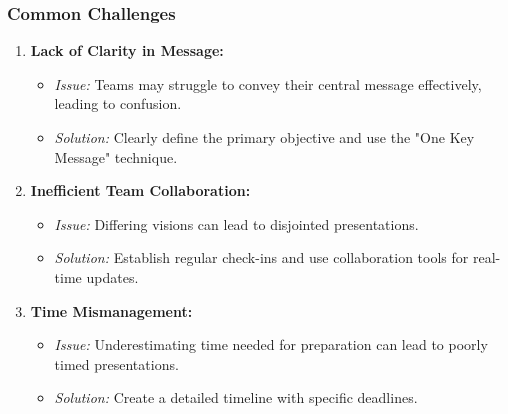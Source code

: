 \documentclass[aspectratio=169]{beamer}
\begin{document}
\begin{frame}[fragile]
    \frametitle{Common Challenges}
    \begin{enumerate}
        \item \textbf{Lack of Clarity in Message:}
            \begin{itemize}
                \item \textit{Issue:} Teams may struggle to convey their central message effectively, leading to confusion.
                \item \textit{Solution:} Clearly define the primary objective and use the "One Key Message" technique.
            \end{itemize}

        \item \textbf{Inefficient Team Collaboration:}
            \begin{itemize}
                \item \textit{Issue:} Differing visions can lead to disjointed presentations.
                \item \textit{Solution:} Establish regular check-ins and use collaboration tools for real-time updates.
            \end{itemize}
        
        \item \textbf{Time Mismanagement:}
            \begin{itemize}
                \item \textit{Issue:} Underestimating time needed for preparation can lead to poorly timed presentations.
                \item \textit{Solution:} Create a detailed timeline with specific deadlines.
            \end{itemize}
    \end{enumerate}
\end{frame}
\end{document}
